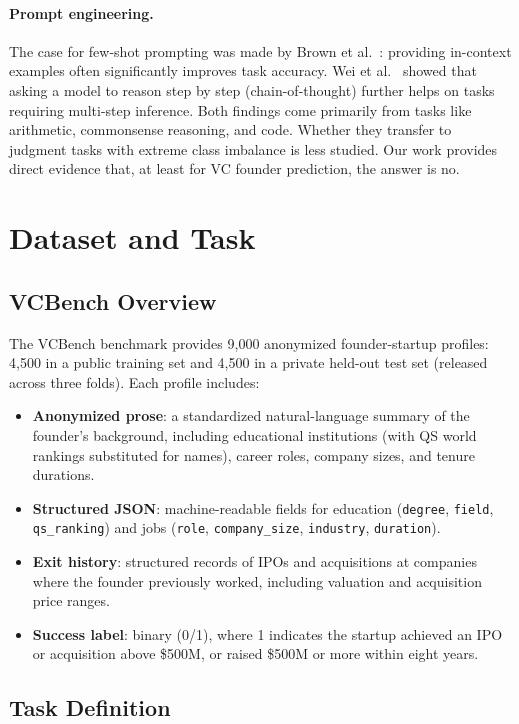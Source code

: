 \documentclass{article}
\begin{document}
\paragraph{Prompt engineering.} The case for few-shot prompting was made by Brown et al.~\cite{brown2020gpt3}: providing in-context examples often significantly improves task accuracy. Wei et al.~\cite{wei2022cot} showed that asking a model to reason step by step (chain-of-thought) further helps on tasks requiring multi-step inference. Both findings come primarily from tasks like arithmetic, commonsense reasoning, and code. Whether they transfer to judgment tasks with extreme class imbalance is less studied. Our work provides direct evidence that, at least for VC founder prediction, the answer is no.

\section{Dataset and Task}

\subsection{VCBench Overview}

The VCBench benchmark \cite{chen2025vcbench} provides 9,000 anonymized founder-startup profiles: 4,500 in a public training set and 4,500 in a private held-out test set (released across three folds). Each profile includes:
\begin{itemize}
  \item \textbf{Anonymized prose}: a standardized natural-language summary of the founder's background, including educational institutions (with QS world rankings substituted for names), career roles, company sizes, and tenure durations.
  \item \textbf{Structured JSON}: machine-readable fields for education (\texttt{degree}, \texttt{field}, \texttt{qs\_ranking}) and jobs (\texttt{role}, \texttt{company\_size}, \texttt{industry}, \texttt{duration}).
  \item \textbf{Exit history}: structured records of IPOs and acquisitions at companies where the founder previously worked, including valuation and acquisition price ranges.
  \item \textbf{Success label}: binary (0/1), where 1 indicates the startup achieved an IPO or acquisition above \$500M, or raised \$500M or more within eight years.
\end{itemize}

\subsection{Task Definition}
\end{document}
